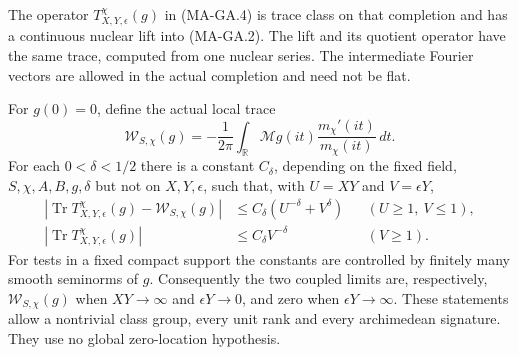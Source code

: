 The operator $T^\chi_{X,Y,\epsilon}(g)$ in (MA-GA.4) is trace class on that completion
and has a continuous nuclear lift into (MA-GA.2).  The lift
and its quotient operator have the same trace, computed from
one nuclear series.  The intermediate Fourier vectors are
allowed in the actual completion and need not be flat.

For $g(0)=0$, define the actual local trace
\[
 \mathcal W_{S,\chi}(g)
    =-\frac1{2\pi}\int_{\mathbb R}
             \mathcal Mg(it)\frac{m_\chi'(it)}{m_\chi(it)}\,dt.
 \tag{MA-GA.6}
\]
For each $0<\delta<1/2$ there is a constant $C_\delta$,
depending on the fixed field, $S,\chi,A,B,g,\delta$ but not
on $X,Y,\epsilon$, such that, with $U=XY$ and $V=\epsilon Y$,
\[
\begin{aligned}
 \left|\operatorname{Tr}T^\chi_{X,Y,\epsilon}(g)
                    -\mathcal W_{S,\chi}(g)\right|
   &\leq C_\delta(U^{-\delta}+V^\delta)
          &&(U\geq1,\ V\leq1),\\
 \left|\operatorname{Tr}T^\chi_{X,Y,\epsilon}(g)\right|
   &\leq C_\delta V^{-\delta}
          &&(V\geq1).
\end{aligned}
 \tag{MA-GA.7}
\]
For tests in a fixed compact support the constants are
controlled by finitely many smooth seminorms of $g$.
Consequently the two coupled limits are, respectively,
$\mathcal W_{S,\chi}(g)$ when $XY\to\infty$ and
$\epsilon Y\to0$, and zero when $\epsilon Y\to\infty$.
These statements allow a nontrivial class group, every unit
rank and every archimedean signature.  They use no global
zero-location hypothesis.

